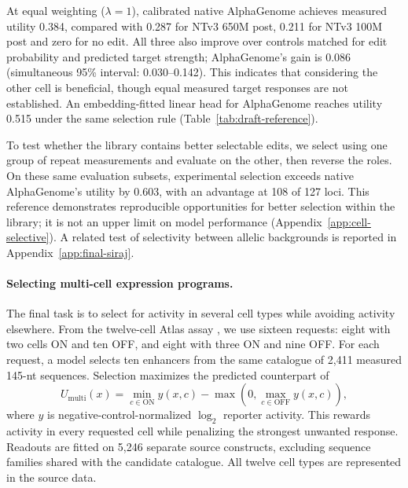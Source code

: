 At equal weighting ($\lambda=1$), calibrated native AlphaGenome
achieves measured utility 0.384, compared with 0.287 for NTv3
650M post, 0.211 for NTv3 100M post and zero for no edit.
All three also improve over controls matched for edit probability
and predicted target strength; AlphaGenome's gain is 0.086
(simultaneous 95\% interval: 0.030--0.142).
This indicates that considering the other cell is beneficial, though equal measured target responses are not established. An embedding-fitted linear head for AlphaGenome reaches utility 0.515 under the same selection
rule (Table~\ref{tab:draft-reference}).

To test whether the library contains better selectable edits,
we select using one group of repeat measurements and evaluate on the other,
then reverse the roles. On these same evaluation subsets,
experimental selection exceeds native AlphaGenome's utility by
0.603, with an advantage at 108 of 127 loci.
This reference demonstrates reproducible opportunities for
better selection within the library; it is not an upper limit
on model performance (Appendix~\ref{app:cell-selective}).
A related test of selectivity between allelic backgrounds is
reported in Appendix~\ref{app:final-siraj}.



\paragraph{Selecting multi-cell expression programs.}
\label{sec:multicell-programming}

The final task is to select for activity in several cell types while
avoiding activity elsewhere. From the twelve-cell Atlas assay
\citep{castillohair2025atlas}, we use sixteen requests: eight
with two cells ON and ten OFF, and eight with three ON and
nine OFF. For each request, a model selects ten enhancers from
the same catalogue of 2,411 measured 145-nt sequences.
Selection maximizes the predicted counterpart of
\begin{equation}
 U_{\mathrm{multi}}(x)
 =
 \min_{c\in\mathrm{ON}}y(x,c)
 -
 \max\!\left(0,\max_{c\in\mathrm{OFF}}y(x,c)\right),
 \label{eq:multicell-utility}
\end{equation}
where $y$ is negative-control-normalized $\log_2$ reporter
activity. This rewards activity in every requested cell while
penalizing the strongest unwanted response. Readouts are fitted
on 5,246 separate source constructs, excluding sequence families
shared with the candidate catalogue. All twelve cell types are
represented in the source data.

